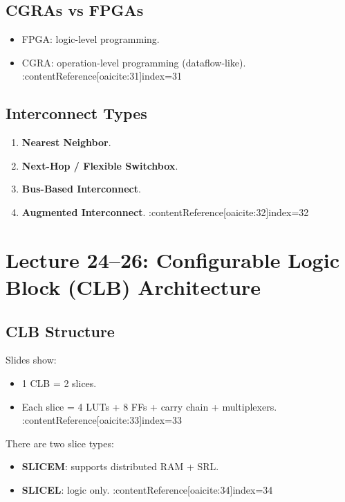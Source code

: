 \documentclass[11pt]{article}
\begin{document}
\subsection{CGRAs vs FPGAs}
\begin{itemize}
    \item FPGA: logic-level programming.
    \item CGRA: operation-level programming (dataflow-like). :contentReference[oaicite:31]{index=31}
\end{itemize}

\subsection{Interconnect Types}
\begin{enumerate}
    \item \textbf{Nearest Neighbor}.  
    \item \textbf{Next-Hop / Flexible Switchbox}.  
    \item \textbf{Bus-Based Interconnect}.  
    \item \textbf{Augmented Interconnect}. :contentReference[oaicite:32]{index=32}
\end{enumerate}

\newpage

\section{Lecture 24--26: Configurable Logic Block (CLB) Architecture}

\subsection{CLB Structure}
Slides show:
\begin{itemize}
    \item 1 CLB = 2 slices.
    \item Each slice = 4 LUTs + 8 FFs + carry chain + multiplexers. :contentReference[oaicite:33]{index=33}
\end{itemize}

There are two slice types:
\begin{itemize}
    \item \textbf{SLICEM}: supports distributed RAM + SRL.
    \item \textbf{SLICEL}: logic only. :contentReference[oaicite:34]{index=34}
\end{itemize}
\end{document}
